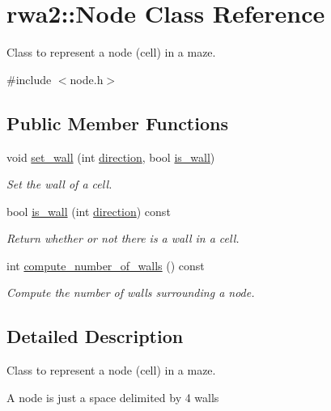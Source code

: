 \hypertarget{classrwa2_1_1_node}{}\section{rwa2\+:\+:Node Class Reference}
\label{classrwa2_1_1_node}


Class to represent a node (cell) in a maze.  




{\ttfamily \#include $<$node.\+h$>$}

\subsection*{Public Member Functions}
\begin{DoxyCompactItemize}
\item 
void \hyperlink{classrwa2_1_1_node_a9e887221d02616392f572dd4018b71ed}{set\+\_\+wall} (int \hyperlink{util_8h_a99f26e6ee9fcd62f75203b5402df8098}{direction}, bool \hyperlink{classrwa2_1_1_node_acd6ab64157b7b60bea708ddb52ddb1a8}{is\+\_\+wall})
\begin{DoxyCompactList}\small\item\em Set the wall of a cell. \end{DoxyCompactList}\item 
bool \hyperlink{classrwa2_1_1_node_acd6ab64157b7b60bea708ddb52ddb1a8}{is\+\_\+wall} (int \hyperlink{util_8h_a99f26e6ee9fcd62f75203b5402df8098}{direction}) const
\begin{DoxyCompactList}\small\item\em Return whether or not there is a wall in a cell. \end{DoxyCompactList}\item 
int \hyperlink{classrwa2_1_1_node_a6057b0b97f6b815a57aad534cd021674}{compute\+\_\+number\+\_\+of\+\_\+walls} () const
\begin{DoxyCompactList}\small\item\em Compute the number of walls surrounding a node. \end{DoxyCompactList}\end{DoxyCompactItemize}


\subsection{Detailed Description}
Class to represent a node (cell) in a maze. 

A node is just a space delimited by 4 walls 

